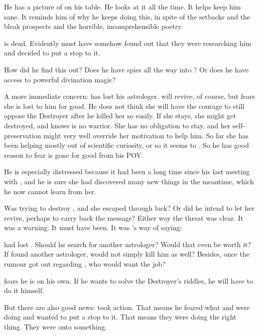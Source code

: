 He has a picture of \Firaxel on his table. 
He looks at it all the time. 
It helps keep him sane.
It reminds him of why he keeps doing this, in spite of the setbacks and the bleak prospects and the horrible, incomprehensible poetry. 

\Urizeth is dead. 
Evidently \Ishnaruchaefir must have somehow found out that they were researching him and decided to put a stop to it. 

How did he find this out? 
Does he have spies all the way into \Nyx? 
Or does he have access to powerful divination magic?

A more immediate concern: \Teshrial has lost his astrologer. 
\Urizeth will revive, of course, but \Teshrial fears she is lost to him for good. 
He does not think she will have the courage to still oppose the Destroyer after he killed her so easily. 
If she stays, she might get destroyed, and \Teshrial knows \Urizeth is no warrior.
She has no obligation to stay, and her self-preservation might very well override her motivation to help him.
So far she has been helping \Teshrial mostly out of scientific curiosity, or so it seems to \Teshrial.
So he has good reason to fear \Urizeth is gone for good from his POV.

He is especially distressed because it had been a long time since his last meeting with \Urizeth, and he is sure she had discovered many new things in the meantime, which he now cannot learn from her. 

Was \Ishnaruchaefir trying to destroy \Urizeth, and she escaped through luck?
Or did he intend to let her revive, perhaps to carry back the message?
Either way the threat was clear. 
It was a warning. 
It must have been. 
It was \Ishnaruchaefir's way of saying:

\Teshrial had lost \Urizeth. 
Should he search for another astrologer? 
Would that even be worth it?
If \Teshrial found another astrologer, would \Ishnaruchaefir not simply kill him as well?
Besides, once the rumour got out regarding \Urizeth, who would want the job? 

\Teshrial fears he is on his own. 
If he wants to solve the Destroyer's riddles, he will have to do it himself. 

But there are also good news: 
\Ishnaruchaefir took action. 
That means he feared what \Teshrial and \Urizeth were doing and wanted to put a stop to it. 
That means they were doing the right thing. 
They were onto something. 

